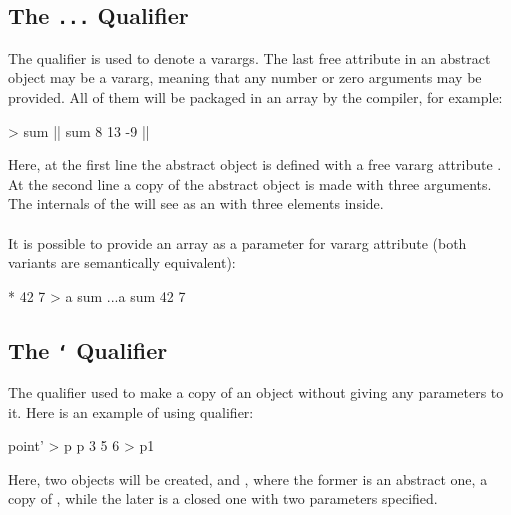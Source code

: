 \documentclass[12pt]{book}
\begin{document}
\subsection{The \texttt{...} Qualifier} \label{subsec:"..."-qualifier}
The  qualifier is used to denote a varargs. The last free attribute in an abstract object may be a vararg, meaning that any number or zero arguments may be provided. All of them will be packaged in an array by the compiler, for example:
\begin{ffcode}
[x...] > sum |$\label{ln:sum-def}$|
sum 8 13 -9 |$\label{ln:sum-instance}$|
\end{ffcode}
Here, at the first line the abstract object  is defined with a free vararg attribute . At the second line a copy of the abstract object is made with three arguments. The internals of the  will see  as an  with three elements inside.
\\
\\
It is possible to provide an array as a parameter for vararg attribute (both variants are semantically equivalent):
\begin{ffcode}
* 42 7 > a
sum ...a
sum 42 7
\end{ffcode}

\subsection{The \texttt{`} Qualifier} \label{subsec:"`"-qualifier}
The  qualifier used to make a copy of an object without giving any parameters to it. Here is an example of using  qualifier:
\begin{ffcode}
point' > p
p 3 5 6 > p1
\end{ffcode}
Here, two objects will be created,  and , where the former is an abstract one, a copy of , while the later is a closed one with two parameters specified.
\end{document}
